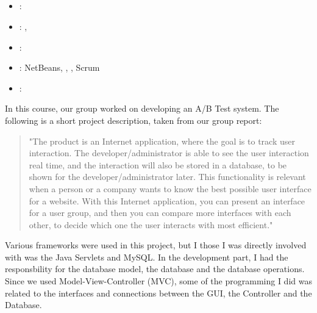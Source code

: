 \subsection[Applied Computer Science Project]{}
\label{sec:appl_comp_sci_proj}
\begin{itemize} 
	\item {}: 
	\item {}: , 
	\item {}: 
	\item {}: NetBeans, , , Scrum
	\item {}: 
\end{itemize} 
In this course, our group worked on developing an A/B Test system. 
The following is a short project description, taken from our group report:
\begin{quote} 
"The product is an Internet application, where the goal is to track user interaction. 
The developer/administrator is able to see the user interaction real time, and the interaction will also be stored in a database, to be shown for the developer/administrator later. 
This functionality is relevant when a person or a company wants to know the best possible user interface for a website.
With this Internet application, you can present an interface for a user group, and then you can compare more interfaces with each other, 
to decide which one the user interacts with most efficient."
\end{quote}
Various frameworks were used in this project, but I those I was directly involved with was the Java Servlets and MySQL. 
In the development part, I had the responsbility for the database model, the database and the database operations. 
Since we used Model-View-Controller (MVC), some of the programming I did was related to the interfaces and connections between the GUI, the Controller and the Database.

